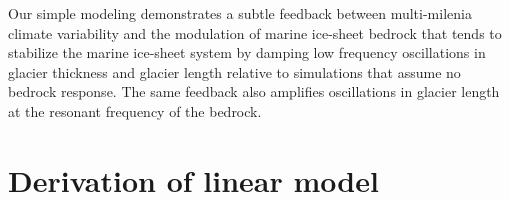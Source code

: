 \documentclass[tc, manuscript]{copernicus}
\begin{document}
\conclusions  
Our simple modeling demonstrates a subtle feedback between multi-milenia climate variability and the modulation of marine ice-sheet bedrock that tends to stabilize the marine ice-sheet system by damping low frequency oscillations in glacier thickness and glacier length relative to simulations that assume no bedrock response. 
The same feedback also amplifies oscillations in glacier length at the resonant frequency of the bedrock.









\appendix
\section{Derivation of linear model}    %
\end{document}
